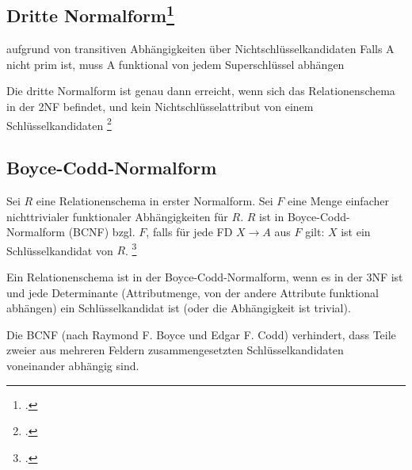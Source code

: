 \documentclass{bschlangaul-theorie}
\begin{document}
\subsection{Dritte Normalform\footcite[Seite 201]{winter}}

aufgrund von transitiven Abhängigkeiten über Nichtschlüsselkandidaten
Falls A nicht prim ist, muss A funktional von jedem Superschlüssel
abhängen

Die dritte Normalform ist genau dann erreicht, wenn sich das
Relationenschema in der 2NF befindet, und kein Nichtschlüsselattribut
von einem Schlüsselkandidaten \footcite[Dritte
Normalform (3NF)]{wiki:normalisierung}








%

\subsection{Boyce-Codd-Normalform}

Sei $R$ eine Relationenschema in erster Normalform. Sei $F$ eine Menge
einfacher nichttrivialer funktionaler Abhängigkeiten für $R$. $R$ ist in
Boyce-Codd-Normalform (BCNF) bzgl. $F$, falls für jede FD $X \rightarrow
A$ aus $F$ gilt: $X$ ist ein Schlüsselkandidat von $R$.
\footcite[Boyce-Codd-Normalform (BCNF)]{wiki:normalisierung}

Ein Relationenschema ist in der Boyce-Codd-Normalform, wenn es in der
3NF ist und jede Determinante (Attributmenge, von der andere Attribute
funktional abhängen) ein Schlüsselkandidat ist (oder die Abhängigkeit
ist trivial).

Die BCNF (nach Raymond F. Boyce und Edgar F. Codd) verhindert, dass
Teile zweier aus mehreren Feldern zusammengesetzten Schlüsselkandidaten
voneinander abhängig sind.
\end{document}
